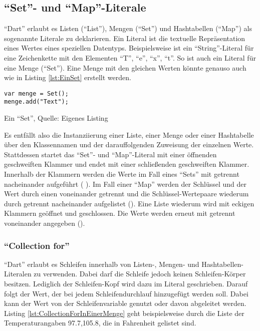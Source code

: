 \subsection{\enquote{Set}- und \enquote{Map}-Literale}
\label{sec:SetUndMapLiterale}

\enquote{Dart} erlaubt es Listen (\enquote{List}), Mengen (\enquote{Set}) und Hashtabellen (\enquote{Map}) als sogenannte Literale zu deklarieren.
Ein Literal ist die textuelle Repräsentation eines Wertes eines speziellen Datentyps.
Beispielsweise ist   ein \enquote{String}-Literal für eine Zeichenkette mit den Elementen \enquote{T}, \enquote{e}, \enquote{x}, \enquote{t}.
So ist auch   ein Literal für eine Menge (\enquote{Set}).
Eine Menge mit den gleichen Werten könnte genauso auch wie in Listing \ref{lst:EinSet} erstellt werden.

\ifIncludeFigures
  \begin{listing}[ht]
    \begin{verbatim}
var menge = Set();
menge.add("Text");
\end{verbatim}
    \caption[Ein \enquote{Set}]{Ein \enquote{Set}, Quelle: Eigenes Listing}
    \label{lst:EinSet}
  \end{listing}
\fi

Es entfällt also die Instanziierung einer Liste, einer Menge oder einer Hashtabelle über den Klassennamen und der darauffolgenden Zuweisung der einzelnen Werte.
Stattdessen startet das \enquote{Set}- und \enquote{Map}-Literal mit einer öffnenden geschweiften Klammer und endet mit einer schließenden geschweiften Klammer.
Innerhalb der Klammern werden die Werte im Fall eines \enquote{Sets} mit \IC{,} getrennt nacheinander aufgeführt (  ).
Im Fall einer \enquote{Map} werden der Schlüssel und der Wert durch einen \IC{:} voneinander getrennt und die Schlüssel-Wertepaare wiederum durch \IC{,} getrennt nacheinander aufgelistet ().
Eine Liste wiederum wird mit eckigen Klammern geöffnet und geschlossen.
Die Werte werden erneut mit \IC{,} getrennt voneinander angegeben (\IC{[1,2]}).

\subsubsection{\enquote{Collection for}} \enquote{Dart} erlaubt es Schleifen innerhalb von Listen-, Mengen- und Hashtabellen-Literalen zu verwenden.
Dabei darf die Schleife jedoch keinen Schleifen-Körper besitzen.
Lediglich der Schleifen-Kopf wird dazu im Literal geschrieben.
Darauf folgt der Wert, der bei jedem Schleifendurchlauf hinzugefügt werden soll.
Dabei kann der Wert von der Schleifenvariable genutzt oder davon abgeleitet werden.
Listing \ref{lst:CollectionForInEinerMenge} geht beispielsweise durch die Liste der Temperaturangaben 97.7,105.8, die in Fahrenheit gelistet sind.

